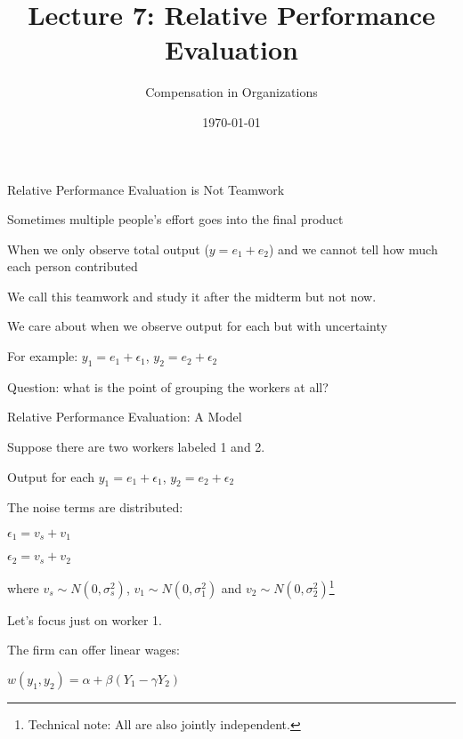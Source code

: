 \documentclass[aspectratio=169,usenames,dvipsnames]{beamer}
\title[diss]{Lecture 7: Relative Performance Evaluation} %
\author{Compensation in Organizations} %
\institute[shortinst]{Jacob Kohlhepp}
\date{\today} %
\newenvironment{wideitemize}{\itemize\addtolength{\itemsep}{10pt}}{\enditemize}
\begin{document}
\begin{frame}
\titlepage %

\end{frame}

\begin{frame}{Relative Performance Evaluation is Not Teamwork}

\begin{wideitemize}
    \item Sometimes multiple people's effort goes into the final product
    \item When we only observe total output ($y=e_1+e_2$) and we cannot tell how much each person contributed
    \item We call this teamwork and study it after the midterm but not now.
    \item We care about when we observe output for each but with uncertainty
    \item For example: $y_1=e_1 + \epsilon_1$, $y_2=e_2 + \epsilon_2$
    \item Question: what is the point of grouping the workers at all?
\end{wideitemize}
    
\end{frame}

\begin{frame}{Relative Performance Evaluation: A Model}

\begin{wideitemize}
    \item Suppose there are two workers labeled 1 and 2.
    \item Output for each $y_1=e_1 + \epsilon_1$, $y_2=e_2 + \epsilon_2$
    \item The noise terms are distributed:
    \begin{wideitemize}
        \item $\epsilon_1= v_s + v_1$
        \item $\epsilon_2= v_s + v_2$
        \item where $v_s \sim N(0,\sigma^2_{s})$, $v_1 \sim N(0,\sigma^2_{1})$ and $v_2 \sim N(0,\sigma^2_{2})$\footnote{Technical note: All are also jointly independent.}
    \end{wideitemize}
    \item Let's focus just on worker 1.
    \item The firm can offer linear wages:
    \begin{wideitemize}
        \item $w(y_1, y_{2}) = \alpha + \beta (Y_1 - \gamma Y_2)$
    \end{wideitemize}
\end{wideitemize}
    
\end{frame}
\end{document}
